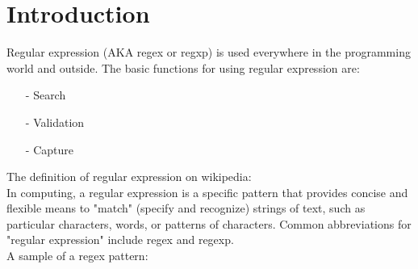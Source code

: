 \newcommand{\WorkWeek}{1302} %
\newcommand{\BossName}{Arden Chang} %
\newcommand{\BossInitials}{ARDN} %
\newcommand{\Author}{Qiling Bo} %
\newcommand{\AuthorInitials}{QIBO} %
\newcommand{\MemoNumber}{080} %
\newcommand{\Subject}{THE REGULAR EXPRESSION TUTORIAL} %
\newcommand{\Category}{regex, test development} %
\newcommand{\Distribution}{PZHO, MZFA, WEIQ, ARDN, RQB, BMOCHINA} %





\maketitle


\section{Introduction}

Regular expression (AKA regex or regxp) is used everywhere in the programming world and outside. The basic functions for using regular expression are:

\begin{itemize}
\item[-]
	Search
\item[-]
	Validation
\item[-]
	Capture	
\end{itemize}

The definition of regular expression on wikipedia: \\
In computing, a regular expression is a specific pattern that provides concise and flexible means to "match" (specify and recognize) strings of text, such as particular characters, words, or patterns of characters. Common abbreviations for "regular expression" include regex and regexp.\\
A sample of a regex pattern:

